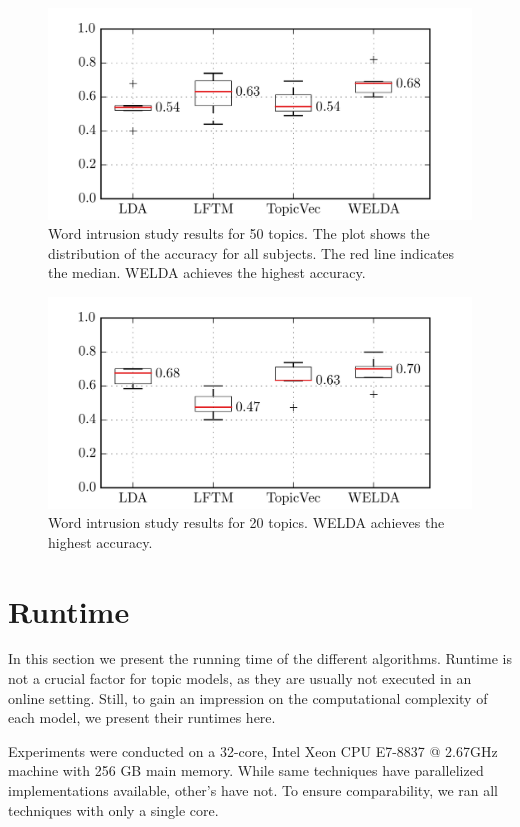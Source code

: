 \documentclass[
        a4paper,
        titlepage,
        twoside,
        parskip,
        numbers=noenddot
        ]{scrbook}
\theoremstyle{break}
\begin{document}
\begin{figure}
       \centering
       \includegraphics[width=12cm]{figures/word_intrusion_50.png}
       \caption{Word intrusion study results for 50 topics. The plot shows the distribution of the accuracy for all subjects. The red line indicates the median. WELDA achieves the highest accuracy.}
       \label{fig:word_intrusion_50}
\end{figure}

\begin{figure}
       \centering
       \includegraphics[width=12cm]{figures/word_intrusion_20.png}
       \caption{Word intrusion study results for 20 topics. WELDA achieves the highest accuracy.}
       \label{fig:word_intrusion_20}
\end{figure}

\section{Runtime}
\label{sec:runtime}

In this section we present the running time of the different algorithms.
Runtime is not a crucial factor for topic models, as they are usually not executed in an online setting.
Still, to gain an impression on the computational complexity of each model, we present their runtimes here.

Experiments were conducted on a 32-core, Intel Xeon CPU E7-8837 @ 2.67GHz machine with 256 GB main memory.
While same techniques have parallelized implementations available, other's have not.
To ensure comparability, we ran all techniques with only a single core.
\end{document}
